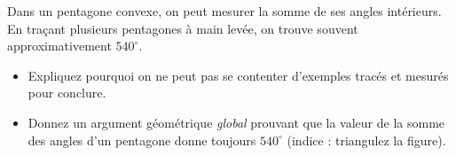 Dans un pentagone convexe, on peut mesurer la somme de ses angles
intérieurs. En traçant plusieurs pentagones à main levée, on trouve souvent
approximativement $540^\circ$.
\begin{itemize}
  \item Expliquez pourquoi on ne peut pas se contenter d'exemples tracés et
  mesurés pour conclure.
  \item Donnez un argument géométrique \emph{global} prouvant que la valeur de
  la somme des angles d'un pentagone donne toujours $540^\circ$ (indice :
  triangulez la figure).
\end{itemize}
